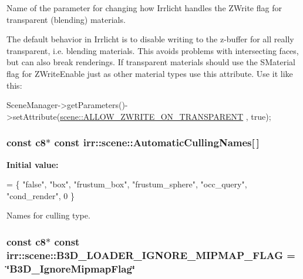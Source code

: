 Name of the parameter for changing how Irrlicht handles the Z\+Write flag for transparent (blending) materials. 

The default behavior in Irrlicht is to disable writing to the z-\/buffer for all really transparent, i.\+e. blending materials. This avoids problems with intersecting faces, but can also break renderings. If transparent materials should use the S\+Material flag for Z\+Write\+Enable just as other material types use this attribute. Use it like this\+: 
\begin{DoxyCode}
SceneManager->getParameters()->setAttribute(\hyperlink{namespaceirr_1_1scene_ab585d23bc2a3d02cd368d8bfd0b1414a}{scene::ALLOW\_ZWRITE\_ON\_TRANSPARENT}
      , \textcolor{keyword}{true});
\end{DoxyCode}
\subsubsection[{\texorpdfstring{Automatic\+Culling\+Names}{AutomaticCullingNames}}]{\setlength{\rightskip}{0pt plus 5cm}const {\bf c8}$\ast$ const irr\+::scene\+::\+Automatic\+Culling\+Names\mbox{[}$\,$\mbox{]}}\hypertarget{namespaceirr_1_1scene_afb3e3fc1668bd602189bab446801aa12}{}\label{namespaceirr_1_1scene_afb3e3fc1668bd602189bab446801aa12}
{\bfseries Initial value\+:}
\begin{DoxyCode}
=
    \{
        \textcolor{stringliteral}{"false"},
        \textcolor{stringliteral}{"box"},          
        \textcolor{stringliteral}{"frustum\_box"},      
        \textcolor{stringliteral}{"frustum\_sphere"},   
        \textcolor{stringliteral}{"occ\_query"},    
        \textcolor{stringliteral}{"cond\_render"},
        0
    \}
\end{DoxyCode}


Names for culling type. 

\subsubsection[{\texorpdfstring{B3\+D\+\_\+\+L\+O\+A\+D\+E\+R\+\_\+\+I\+G\+N\+O\+R\+E\+\_\+\+M\+I\+P\+M\+A\+P\+\_\+\+F\+L\+AG}{B3D\_LOADER\_IGNORE\_MIPMAP\_FLAG}}]{\setlength{\rightskip}{0pt plus 5cm}const {\bf c8}$\ast$ const irr\+::scene\+::\+B3\+D\+\_\+\+L\+O\+A\+D\+E\+R\+\_\+\+I\+G\+N\+O\+R\+E\+\_\+\+M\+I\+P\+M\+A\+P\+\_\+\+F\+L\+AG = \char`\"{}B3\+D\+\_\+\+Ignore\+Mipmap\+Flag\char`\"{}}\hypertarget{namespaceirr_1_1scene_a0a190773ebdbed9f134b17d496fc526a}{}\label{namespaceirr_1_1scene_a0a190773ebdbed9f134b17d496fc526a}



